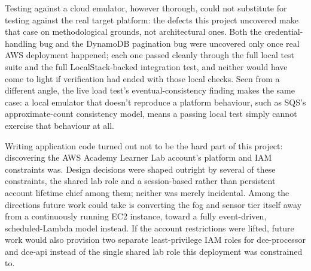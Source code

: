 \documentclass[conference]{IEEEtran}
\begin{document}
Testing against a cloud emulator, however thorough, could not substitute for testing against the real target platform: the defects this project uncovered make that case on methodological grounds, not architectural ones. Both the credential-handling bug and the DynamoDB pagination bug were uncovered only once real AWS deployment happened; each one passed cleanly through the full local test suite and the full LocalStack-backed integration test, and neither would have come to light if verification had ended with those local checks. Seen from a different angle, the live load test's eventual-consistency finding makes the same case: a local emulator that doesn't reproduce a platform behaviour, such as SQS's approximate-count consistency model, means a passing local test simply cannot exercise that behaviour at all.

Writing application code turned out not to be the hard part of this project: discovering the AWS Academy Learner Lab account's platform and IAM constraints was. Design decisions were shaped outright by several of these constraints, the shared lab role and a session-based rather than persistent account lifetime chief among them; neither was merely incidental. Among the directions future work could take is converting the fog and sensor tier itself away from a continuously running EC2 instance, toward a fully event-driven, scheduled-Lambda model instead. If the account restrictions were lifted, future work would also provision two separate least-privilege IAM roles for dce-processor and dce-api instead of the single shared lab role this deployment was constrained to.



\end{document}
